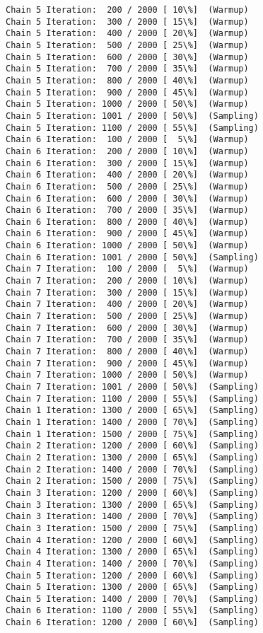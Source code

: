 \documentclass[11pt]{article}
\begin{document}
\begin{Verbatim}[commandchars=\\\{\}]
Chain 5 Iteration:  200 / 2000 [ 10\%]  (Warmup)
Chain 5 Iteration:  300 / 2000 [ 15\%]  (Warmup)
Chain 5 Iteration:  400 / 2000 [ 20\%]  (Warmup)
Chain 5 Iteration:  500 / 2000 [ 25\%]  (Warmup)
Chain 5 Iteration:  600 / 2000 [ 30\%]  (Warmup)
Chain 5 Iteration:  700 / 2000 [ 35\%]  (Warmup)
Chain 5 Iteration:  800 / 2000 [ 40\%]  (Warmup)
Chain 5 Iteration:  900 / 2000 [ 45\%]  (Warmup)
Chain 5 Iteration: 1000 / 2000 [ 50\%]  (Warmup)
Chain 5 Iteration: 1001 / 2000 [ 50\%]  (Sampling)
Chain 5 Iteration: 1100 / 2000 [ 55\%]  (Sampling)
Chain 6 Iteration:  100 / 2000 [  5\%]  (Warmup)
Chain 6 Iteration:  200 / 2000 [ 10\%]  (Warmup)
Chain 6 Iteration:  300 / 2000 [ 15\%]  (Warmup)
Chain 6 Iteration:  400 / 2000 [ 20\%]  (Warmup)
Chain 6 Iteration:  500 / 2000 [ 25\%]  (Warmup)
Chain 6 Iteration:  600 / 2000 [ 30\%]  (Warmup)
Chain 6 Iteration:  700 / 2000 [ 35\%]  (Warmup)
Chain 6 Iteration:  800 / 2000 [ 40\%]  (Warmup)
Chain 6 Iteration:  900 / 2000 [ 45\%]  (Warmup)
Chain 6 Iteration: 1000 / 2000 [ 50\%]  (Warmup)
Chain 6 Iteration: 1001 / 2000 [ 50\%]  (Sampling)
Chain 7 Iteration:  100 / 2000 [  5\%]  (Warmup)
Chain 7 Iteration:  200 / 2000 [ 10\%]  (Warmup)
Chain 7 Iteration:  300 / 2000 [ 15\%]  (Warmup)
Chain 7 Iteration:  400 / 2000 [ 20\%]  (Warmup)
Chain 7 Iteration:  500 / 2000 [ 25\%]  (Warmup)
Chain 7 Iteration:  600 / 2000 [ 30\%]  (Warmup)
Chain 7 Iteration:  700 / 2000 [ 35\%]  (Warmup)
Chain 7 Iteration:  800 / 2000 [ 40\%]  (Warmup)
Chain 7 Iteration:  900 / 2000 [ 45\%]  (Warmup)
Chain 7 Iteration: 1000 / 2000 [ 50\%]  (Warmup)
Chain 7 Iteration: 1001 / 2000 [ 50\%]  (Sampling)
Chain 7 Iteration: 1100 / 2000 [ 55\%]  (Sampling)
Chain 1 Iteration: 1300 / 2000 [ 65\%]  (Sampling)
Chain 1 Iteration: 1400 / 2000 [ 70\%]  (Sampling)
Chain 1 Iteration: 1500 / 2000 [ 75\%]  (Sampling)
Chain 2 Iteration: 1200 / 2000 [ 60\%]  (Sampling)
Chain 2 Iteration: 1300 / 2000 [ 65\%]  (Sampling)
Chain 2 Iteration: 1400 / 2000 [ 70\%]  (Sampling)
Chain 2 Iteration: 1500 / 2000 [ 75\%]  (Sampling)
Chain 3 Iteration: 1200 / 2000 [ 60\%]  (Sampling)
Chain 3 Iteration: 1300 / 2000 [ 65\%]  (Sampling)
Chain 3 Iteration: 1400 / 2000 [ 70\%]  (Sampling)
Chain 3 Iteration: 1500 / 2000 [ 75\%]  (Sampling)
Chain 4 Iteration: 1200 / 2000 [ 60\%]  (Sampling)
Chain 4 Iteration: 1300 / 2000 [ 65\%]  (Sampling)
Chain 4 Iteration: 1400 / 2000 [ 70\%]  (Sampling)
Chain 5 Iteration: 1200 / 2000 [ 60\%]  (Sampling)
Chain 5 Iteration: 1300 / 2000 [ 65\%]  (Sampling)
Chain 5 Iteration: 1400 / 2000 [ 70\%]  (Sampling)
Chain 6 Iteration: 1100 / 2000 [ 55\%]  (Sampling)
Chain 6 Iteration: 1200 / 2000 [ 60\%]  (Sampling)

\end{Verbatim}
\end{document}
